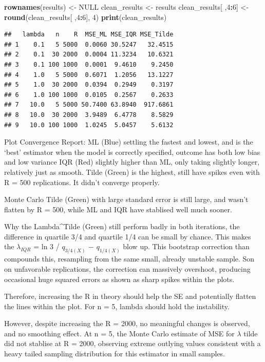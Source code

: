 \documentclass[
]{article}
\newenvironment{Shaded}{\begin{snugshade}}{\end{snugshade}}
\newcommand{\ConstantTok}[1]{\textcolor[rgb]{0.56,0.35,0.01}{#1}}
\newcommand{\DecValTok}[1]{\textcolor[rgb]{0.00,0.00,0.81}{#1}}
\newcommand{\FunctionTok}[1]{\textcolor[rgb]{0.13,0.29,0.53}{\textbf{#1}}}
\newcommand{\NormalTok}[1]{#1}
\newcommand{\OtherTok}[1]{\textcolor[rgb]{0.56,0.35,0.01}{#1}}
\newcommand{\SpecialCharTok}[1]{\textcolor[rgb]{0.81,0.36,0.00}{\textbf{#1}}}
\begin{document}
\begin{Shaded}
\begin{Highlighting}[]
\FunctionTok{rownames}\NormalTok{(results) }\OtherTok{\textless{}{-}} \ConstantTok{NULL}
\NormalTok{clean\_results }\OtherTok{\textless{}{-}}\NormalTok{ results}
\NormalTok{clean\_results[ ,}\DecValTok{4}\SpecialCharTok{:}\DecValTok{6}\NormalTok{] }\OtherTok{\textless{}{-}} \FunctionTok{round}\NormalTok{(clean\_results[ ,}\DecValTok{4}\SpecialCharTok{:}\DecValTok{6}\NormalTok{], }\DecValTok{4}\NormalTok{)}
\FunctionTok{print}\NormalTok{(clean\_results)}
\end{Highlighting}
\end{Shaded}

\begin{verbatim}
##   lambda   n    R  MSE_ML MSE_IQR MSE_Tilde
## 1    0.1   5 5000  0.0060 30.5247   32.4515
## 2    0.1  30 2000  0.0004 11.3234   10.6321
## 3    0.1 100 1000  0.0001  9.4610    9.2450
## 4    1.0   5 5000  0.6071  1.2056   13.1227
## 5    1.0  30 2000  0.0394  0.2949    0.3197
## 6    1.0 100 1000  0.0105  0.2567    0.2633
## 7   10.0   5 5000 50.7400 63.8940  917.6861
## 8   10.0  30 2000  3.9489  6.4778    8.5829
## 9   10.0 100 1000  1.0245  5.0457    5.6132
\end{verbatim}

Plot Convergence Report: ML (Blue) settling the fastest and lowest, and
is the `best' estimator when the model is correctly specified, outcome
has both low bias and low variance IQR (Red) slightly higher than ML,
only taking slightly longer, relatively just as smooth. Tilde (Green) is
the highest, still have spikes even with R = 500 replications. It didn't
converge properly.

Monte Carlo Tilde (Green) with large standard error is still large, and
wasn't flatten by R = 500, while ML and IQR have stablised well much
sooner.

Why the Lambda\^{}Tilde (Green) still perform badly in both iterations,
the difference in quartile 3/4 and quartile 1/4 can be small by chance.
This makes the \(\lambda_{IQR}\) = ln 3 / \(q_{3/4(X)}\) −
\(𝑞_{1/4(X)}\) blow up. This bootstrap correction than compounds this,
resampling from the same small, already unstable sample. Son on
unfavorable replications, the correction can massively overshoot,
producing occasional huge squared errors as shown as sharp spikes within
the plots.

Therefore, increasing the R in theory should help the SE and potentially
flatten the lines within the plot. For n = 5, lambda should hold the
instability.

However, despite increasing the R = 2000, no meaningful changes is
observed, and no smoothing effect. At n = 5, the Monte Carlo estimate of
MSE for \(\lambda\) tilde did not stablise at R = 2000, observing
extreme outlying values consistent with a heavy tailed sampling
distribution for this estimator in small samples.
\end{document}
